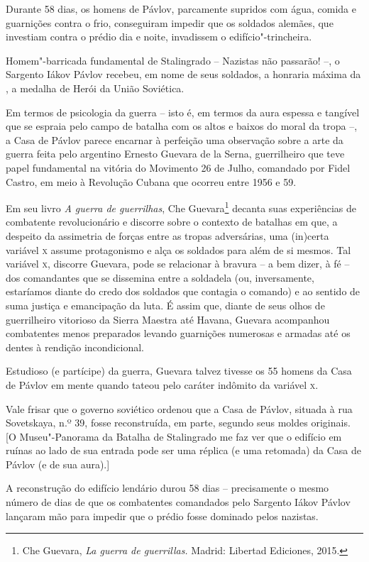 Durante 58 dias, os homens de Pávlov, parcamente supridos com água,
comida e guarnições contra o frio, conseguiram impedir que os soldados
alemães, que investiam contra o prédio dia e noite, invadissem o
edifício"-trincheira.

Homem"-barricada fundamental de Stalingrado -- Nazistas não passarão! --,
o Sargento Iákov Pávlov recebeu, em nome de seus soldados, a honraria
máxima da , a medalha de Herói da União Soviética.

Em termos de psicologia da guerra -- isto é, em termos da aura espessa e
tangível que se espraia pelo campo de batalha com os altos e baixos do
moral da tropa --, a Casa de Pávlov parece encarnar à perfeição uma
observação sobre a arte da guerra feita pelo argentino Ernesto Guevara
de la Serna, guerrilheiro que teve papel fundamental na vitória do
Movimento 26 de Julho, comandado por Fidel Castro, em meio à Revolução
Cubana que ocorreu entre 1956 e 59.

Em seu livro \emph{A guerra de guerrilhas}, Che Guevara\footnote{Che
  Guevara, \emph{La guerra de guerrillas.} Madrid: Libertad Ediciones,
  2015.} decanta suas experiências de combatente revolucionário e
discorre sobre o contexto de batalhas em que, a despeito da assimetria
de forças entre as tropas adversárias, uma (in)certa variável \textsc{x} assume
protagonismo e alça os soldados para além de si mesmos. Tal variável \textsc{x},
discorre Guevara, pode se relacionar à bravura -- a bem dizer, à fé --
dos comandantes que se dissemina entre a soldadela (ou, inversamente,
estaríamos diante do credo dos soldados que contagia o comando) e ao
sentido de suma justiça e emancipação da luta. É assim que, diante de
seus olhos de guerrilheiro vitorioso da Sierra Maestra até Havana,
Guevara acompanhou combatentes menos preparados levando guarnições
numerosas e armadas até os dentes à rendição incondicional.

Estudioso (e partícipe) da guerra, Guevara talvez tivesse os 55 homens
da Casa de Pávlov em mente quando tateou pelo caráter indômito da
variável \textsc{x}.

Vale frisar que o governo soviético ordenou que a Casa de Pávlov,
situada à rua Sovetskaya, n.º 39, fosse reconstruída, em parte, segundo
seus moldes originais. {[}O Museu"-Panorama da Batalha de Stalingrado me
faz ver que o edifício em ruínas ao lado de sua entrada pode ser uma
réplica (e uma retomada) da Casa de Pávlov (e de sua aura).{]}

A reconstrução do edifício lendário durou 58 dias -- precisamente o
mesmo número de dias de que os combatentes comandados pelo Sargento
Iákov Pávlov lançaram mão para impedir que o prédio fosse dominado pelos
nazistas.

